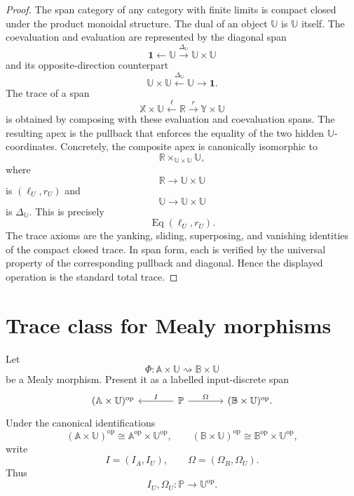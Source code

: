 \begin{proof}
The span category of any category with finite limits is compact closed under
the product monoidal structure.  The dual of an object \(\mathbb U\) is
\(\mathbb U\) itself.  The coevaluation and evaluation are represented by the
diagonal span
\[
\mathbf 1
\longleftarrow
\mathbb U
\xrightarrow{\Delta_{\mathbb U}}
\mathbb U\times\mathbb U
\]
and its opposite-direction counterpart
\[
\mathbb U\times\mathbb U
\xleftarrow{\Delta_{\mathbb U}}
\mathbb U
\longrightarrow
\mathbf 1.
\]
The trace of a span
\[
\mathbb X\times\mathbb U
\xleftarrow{\ell}
\mathbb R
\xrightarrow{r}
\mathbb Y\times\mathbb U
\]
is obtained by composing with these evaluation and coevaluation spans.  The
resulting apex is the pullback that enforces the equality of the two hidden
\(\mathbb U\)-coordinates.  Concretely, the composite apex is canonically
isomorphic to
\[
\mathbb R\times_{\mathbb U\times\mathbb U}\mathbb U,
\]
where
\[
\mathbb R\to\mathbb U\times\mathbb U
\]
is \((\ell_U,r_U)\) and
\[
\mathbb U\to\mathbb U\times\mathbb U
\]
is \(\Delta_{\mathbb U}\).  This is precisely
\[
\operatorname{Eq}(\ell_U,r_U).
\]
The trace axioms are the yanking, sliding, superposing, and vanishing
identities of the compact closed trace.  In span form, each is verified by
the universal property of the corresponding pullback and diagonal.  Hence the
displayed operation is the standard total trace.
\end{proof}

\section{Trace class for Mealy morphisms}
\label{sec:trace-class-mealy-morphisms}

Let
\[
\Phi:
\mathbb A\times\mathbb U
\rightsquigarrow
\mathbb B\times\mathbb U
\]
be a Mealy morphism.  Present it as a labelled input-discrete span
\[
\begin{tikzcd}[column sep=large]
(\mathbb A\times\mathbb U)^{\mathrm{op}}
&
\mathbb P
  \arrow[l, "I"']
  \arrow[r, "\Omega"]
&
(\mathbb B\times\mathbb U)^{\mathrm{op}} .
\end{tikzcd}
\]
Under the canonical identifications
\[
(\mathbb A\times\mathbb U)^{\mathrm{op}}
\cong
\mathbb A^{\mathrm{op}}\times\mathbb U^{\mathrm{op}},
\qquad
(\mathbb B\times\mathbb U)^{\mathrm{op}}
\cong
\mathbb B^{\mathrm{op}}\times\mathbb U^{\mathrm{op}},
\]
write
\[
I=(I_A,I_U),
\qquad
\Omega=(\Omega_B,\Omega_U).
\]
Thus
\[
I_U,\Omega_U:\mathbb P\to\mathbb U^{\mathrm{op}}.
\]

